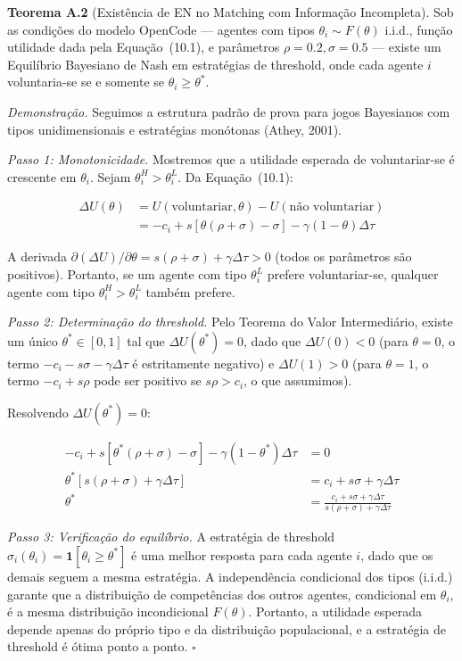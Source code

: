 \textbf{Teorema A.2} (Existência de EN no Matching com Informação Incompleta). Sob as condições do modelo OpenCode --- agentes com tipos $\theta_i \sim F(\theta)$ i.i.d., função utilidade dada pela Equação~(10.1), e parâmetros $\rho = 0.2, \sigma = 0.5$ --- existe um Equilíbrio Bayesiano de Nash em estratégias de threshold, onde cada agente $i$ voluntaria-se se e somente se $\theta_i \geq \theta^*$.

\textit{Demonstração.} Seguimos a estrutura padrão de prova para jogos Bayesianos com tipos unidimensionais e estratégias monótonas (Athey, 2001).

\textit{Passo 1: Monotonicidade.} Mostremos que a utilidade esperada de voluntariar-se é crescente em $\theta_i$. Sejam $\theta_i^H > \theta_i^L$. Da Equação~(10.1):

\begin{align}
\Delta U(\theta) &= U(\text{voluntariar}, \theta) - U(\text{não voluntariar}) \\
&= -c_i + s[\theta(\rho+\sigma) - \sigma] - \gamma(1-\theta)\Delta\tau
\end{align}

A derivada $\partial(\Delta U)/\partial\theta = s(\rho+\sigma) + \gamma\Delta\tau > 0$ (todos os parâmetros são positivos). Portanto, se um agente com tipo $\theta_i^L$ prefere voluntariar-se, qualquer agente com tipo $\theta_i^H > \theta_i^L$ também prefere.

\textit{Passo 2: Determinação do threshold.} Pelo Teorema do Valor Intermediário, existe um único $\theta^* \in [0,1]$ tal que $\Delta U(\theta^*) = 0$, dado que $\Delta U(0) < 0$ (para $\theta=0$, o termo $-c_i - s\sigma - \gamma\Delta\tau$ é estritamente negativo) e $\Delta U(1) > 0$ (para $\theta=1$, o termo $-c_i + s\rho$ pode ser positivo se $s\rho > c_i$, o que assumimos).

Resolvendo $\Delta U(\theta^*) = 0$:

\begin{align}
-c_i + s[\theta^*(\rho+\sigma) - \sigma] - \gamma(1-\theta^*)\Delta\tau &= 0 \\
\theta^*[s(\rho+\sigma) + \gamma\Delta\tau] &= c_i + s\sigma + \gamma\Delta\tau \\
\theta^* &= \frac{c_i + s\sigma + \gamma\Delta\tau}{s(\rho+\sigma) + \gamma\Delta\tau}
\end{align}

\textit{Passo 3: Verificação do equilíbrio.} A estratégia de threshold $\sigma_i(\theta_i) = \mathbf{1}[\theta_i \geq \theta^*]$ é uma melhor resposta para cada agente $i$, dado que os demais seguem a mesma estratégia. A independência condicional dos tipos (i.i.d.) garante que a distribuição de competências dos outros agentes, condicional em $\theta_i$, é a mesma distribuição incondicional $F(\theta)$. Portanto, a utilidade esperada depende apenas do próprio tipo e da distribuição populacional, e a estratégia de threshold é ótima ponto a ponto. \hfill $\square$

